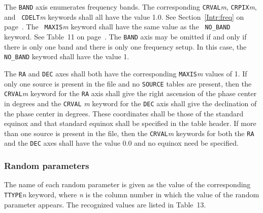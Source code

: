 \documentclass[twoside]{article}
\newcommand{\Hi}[1]{\textcolor{hicol}{#1}}
\newcommand{\Me}[1]{\textcolor{mecol}{#1}}
\begin{document}
The {\tt BAND} axis enumerates frequency bands.  The
\Hi{corresponding} {\tt CRVAL}{\it m}, {\tt CRPIX}{\it m}, and {\tt
  CDELT}{\it m} keywords shall all have the value 1.0.  See
Section~\ref{Intr:freq} on page~\pageref{Intr:freq}.  The {\tt
  MAXIS}{\it m} keyword shall have the same value as the {\tt
  NO\_BAND} keyword.  See Table~11 on page~\pageref{ta:keywords}.  The
{\tt BAND} axis may be omitted if and only if there is only one band
and there is only one frequency setup.  In this case, the {\tt
  NO\_BAND} keyword shall have the value 1.

The {\tt RA} and {\tt DEC} axes shall both have \Hi{the corresponding}
{\tt MAXIS}{\it m} values of 1.  If \Hi{only one} source is
\Hi{present} in the file and no {\tt SOURCE} tables are present, then
the {\tt CRVAL}{\it m} keyword for the {\tt RA} axis shall give the
right ascension of the phase center in degrees and the {\tt CRVAL}{\it
  m} keyword for the {\tt DEC} axis shall give the declination of the
phase center in degrees.  \Me{These coordinates shall be those of the
  standard equinox and that standard equinox shall be specified in
the table header.}  If more than one source is \Hi{present} in the
file, then the {\tt CRVAL}{\it m} keywords for both the {\tt RA} and
the {\tt DEC} axes shall have the value 0.0 \Me{and no equinox need be
  specified}.

\vfill\eject
\subsubsection{Random parameters}

The name of each random parameter is given as the value of the
corresponding {\tt TTYPE}{\it n} keyword\Hi{, where {\it n} is the
column number in which the value of the random parameter appears}.
The recognized values are listed in Table~13.
\end{document}
